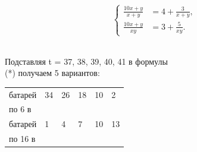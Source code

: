 \begin{minipage}[b]{0.60\textwidth}
	 \[\left\{
	 \begin{aligned}
		\frac{10x+y}{x+y}&=4+\frac{3}{x+y},\\
		\frac{10x+y}{xy}&=3+\frac{5}{xy}.
	\end{aligned}\right.
	\]
	\hphantom\quad\\

\end{minipage}

\newpage
\begin{minipage}[b]{0.42\textwidth}
	\normalsize Подставляя t = 37, 38, 39, 40, 41 в формулы\\
	(*) получаем 5 вариантов:\\
 
\begin{tabular}{ | l | l | l | l | l | l | }
\hline
батарей & 34 & 26 & 18 & 10 & 2\\
по 6 в & \hspace{0pt} & \hspace{0pt} & \hspace{0pt} & \hspace{0pt} & \hspace{0pt}  \\ \hline
батарей  & 1 & 4 & 7 & 10 & 13\\
по 16 в & \hspace{0pt} & \hspace{0pt} & \hspace{0pt} & \hspace{0pt} & \hspace{0pt} \\ 
\hline
\end{tabular}
	

\end{minipage}
